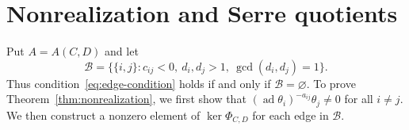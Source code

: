 \documentclass[12pt,reqno]{amsart}
\numberwithin{equation}{section}
\theoremstyle{definition}
\theoremstyle{remark}
\newcommand{\ad}{\operatorname{ad}}
\theoremstyle{plain}
\theoremstyle{plain}
\begin{document}
\section{Nonrealization and Serre quotients}\label{app:serre-quotients}
Put $A=A(C,D)$ and let
\begin{equation}\label{eq:app-exceptional-edges}
    \mathscr B=
    \bigl\{
        \{i,j\}:c_{ij}<0,\ d_i,d_j>1,\
        \gcd(d_i,d_j)=1
    \bigr\}.
\end{equation}
Thus condition~\eqref{eq:edge-condition} holds if and only if $\mathscr B=\varnothing$. To prove Theorem~\ref{thm:nonrealization}, we first show that
$(\ad\theta_i)^{-a_{ij}}\theta_j\ne0$ for all $i\ne j$. We then construct a nonzero element of $\ker\Phi_{C,D}$ for each edge in $\mathscr B$.
\end{document}
